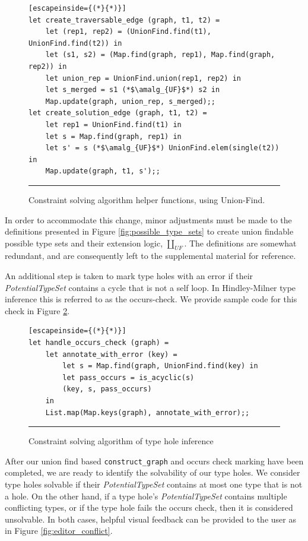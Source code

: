 \begin{figure}[htb!]
\begin{lstlisting}[escapeinside={(*}{*)}]
let create_traversable_edge (graph, t1, t2) =
    let (rep1, rep2) = (UnionFind.find(t1), UnionFind.find(t2)) in
    let (s1, s2) = (Map.find(graph, rep1), Map.find(graph, rep2)) in
    let union_rep = UnionFind.union(rep1, rep2) in
    let s_merged = s1 (*$\amalg_{UF}$*) s2 in
    Map.update(graph, union_rep, s_merged);;
let create_solution_edge (graph, t1, t2) =
    let rep1 = UnionFind.find(t1) in
    let s = Map.find(graph, rep1) in
    let s' = s (*$\amalg_{UF}$*) UnionFind.elem(single(t2)) in
    Map.update(graph, t1, s');;
\end{lstlisting}
\vspace{-2px}
\hrule
\caption{Constraint solving algorithm helper functions, using Union-Find.}
\label{fig:algcode_construct_graph_helpers}
\end{figure}

In order to accommodate this change, minor adjustments must be made to the definitions presented in Figure \ref{fig:possible_type_sets} to create union findable possible type sets and their extension logic, $\amalg_{UF}$. The definitions are somewhat redundant, and are consequently left to the supplemental material for reference.

An additional step is taken to mark type holes with an error if their \emph{PotentialTypeSet} contains a cycle that is not a self loop. In Hindley-Milner type inference this is referred to as the occurs-check. We provide sample code for this check in Figure \ref{fig:occurs_check}.

\begin{figure}[htb!]
\begin{lstlisting}[escapeinside={(*}{*)}]
let handle_occurs_check (graph) =
    let annotate_with_error (key) =
        let s = Map.find(graph, UnionFind.find(key) in
        let pass_occurs = is_acyclic(s)
        (key, s, pass_occurs)
    in
    List.map(Map.keys(graph), annotate_with_error);;
\end{lstlisting}
\vspace{-4px}
 \hrule
\caption{Constraint solving algorithm of type hole inference}
\label{fig:occurs_check}
\end{figure}

After our union find based \lstinline{construct_graph} and occurs check marking have been completed, we are ready to identify the solvability of our type holes. We consider type holes solvable if their \textit{PotentialTypeSet} contains at most one type that is not a hole. On the other hand, if a type hole's \textit{PotentialTypeSet} contains multiple conflicting types, or if the type hole fails the occurs check, then it is considered unsolvable. In both cases, helpful visual feedback can be provided to the user as in Figure \ref{fig:editor_conflict}.

